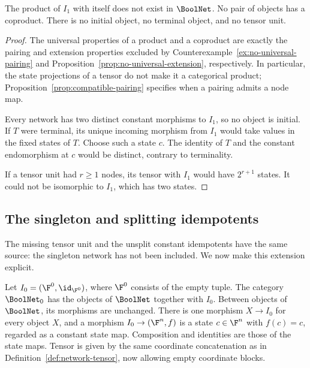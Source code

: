 \begin{proposition}\label{prop:category-universal-obstructions}
The product of $I_1$ with itself does not exist in $\BoolNet$. No pair of objects has a coproduct. There is no initial object, no terminal object, and no tensor unit.
\end{proposition}

\begin{proof}
The universal properties of a product and a coproduct are exactly the pairing and extension properties excluded by Counterexample~\ref{ex:no-universal-pairing} and Proposition~\ref{prop:no-universal-extension}, respectively. In particular, the state projections of a tensor do not make it a categorical product; Proposition~\ref{prop:compatible-pairing} specifies when a pairing admits a node map.

Every network has two distinct constant morphisms to $I_1$, so no object is initial. If $T$ were terminal, its unique incoming morphism from $I_1$ would take values in the fixed states of $T$. Choose such a state $c$. The identity of $T$ and the constant endomorphism at $c$ would be distinct, contrary to terminality.

If a tensor unit had $r\geq1$ nodes, its tensor with $I_1$ would have $2^{r+1}$ states. It could not be isomorphic to $I_1$, which has two states.
\end{proof}

\subsection{The singleton and splitting idempotents}\label{subsec:category-singleton}

The missing tensor unit and the unsplit constant idempotents have the same source: the singleton network has not been included. We now make this extension explicit.

\begin{definition}\label{def:category-singleton-extension}
Let $I_0=(\F^0,\id_{\F^0})$, where $\F^0$ consists of the empty tuple. The category $\BoolNet_0$ has the objects of $\BoolNet$ together with $I_0$. Between objects of $\BoolNet$, its morphisms are unchanged. There is one morphism $X\to I_0$ for every object $X$, and a morphism $I_0\to(\F^n,f)$ is a state $c\in\F^n$ with $f(c)=c$, regarded as a constant state map. Composition and identities are those of the state maps. Tensor is given by the same coordinate concatenation as in Definition~\ref{def:network-tensor}, now allowing empty coordinate blocks.
\end{definition}

